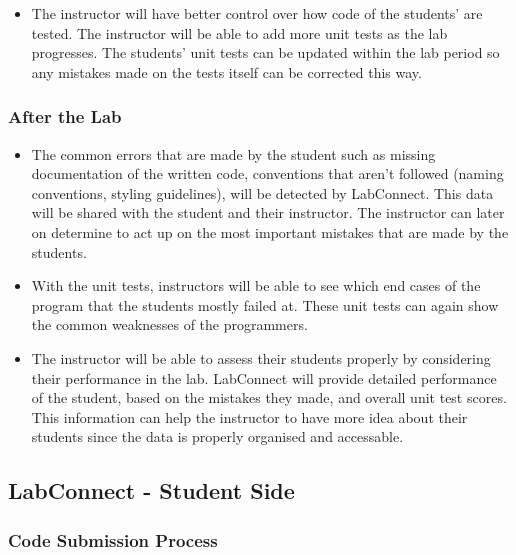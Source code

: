 \documentclass[a4paper, 12pt]{article}
\begin{document}
    \begin{itemize}
        \item The instructor will have better control over how code of the students' are tested.
        The instructor will be able to add more unit tests as the lab progresses.
        The students' unit tests can be updated within the lab period so any mistakes made
        on the tests itself can be corrected this way.
    \end{itemize}

    \subsubsection{After the Lab}

    \begin{itemize}
        \item The common errors that are made by the student such as missing documentation
        of the written code, conventions that aren't followed (naming conventions, styling
        guidelines), will be detected by LabConnect. This data will be shared with the student
        and their instructor. The instructor can later on determine to act up on the most
        important mistakes that are made by the students.
        \item With the unit tests, instructors will be able to see which end cases of the program
        that the students mostly failed at. These unit tests can again show the common weaknesses
        of the programmers.
        \item The instructor will be able to assess their students properly by considering their
        performance in the lab. LabConnect will provide detailed performance of the student,
        based on the mistakes they made, and overall unit test scores. This information can help
        the instructor to have more idea about their students since the data is properly organised
        and accessable.
    \end{itemize}

    \subsection{LabConnect - Student Side}

    \subsubsection{Code Submission Process}
\end{document}
